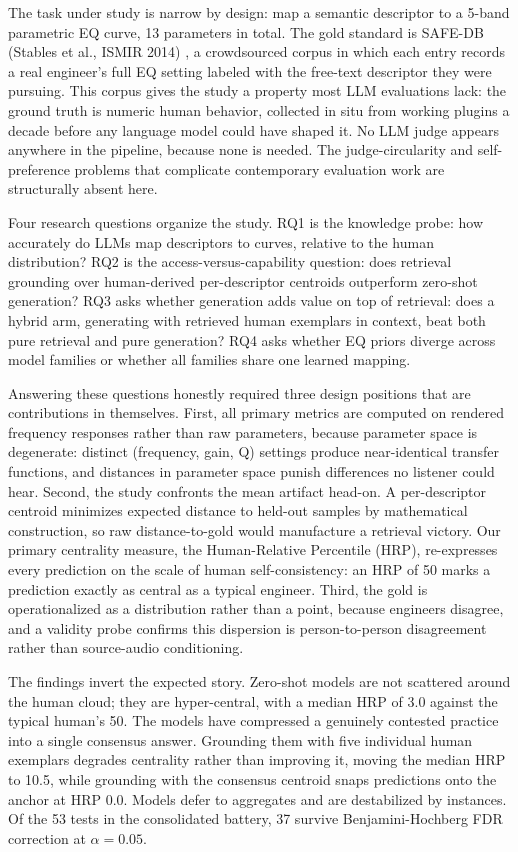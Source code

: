 \documentclass[11pt]{article}
\begin{document}
The task under study is narrow by design: map a semantic descriptor to a 5-band parametric EQ curve, 13 parameters in total. The gold standard is SAFE-DB (Stables et al., ISMIR 2014) \cite{stables2014safe}, a crowdsourced corpus in which each entry records a real engineer's full EQ setting labeled with the free-text descriptor they were pursuing. This corpus gives the study a property most LLM evaluations lack: the ground truth is numeric human behavior, collected in situ from working plugins a decade before any language model could have shaped it. No LLM judge appears anywhere in the pipeline, because none is needed. The judge-circularity and self-preference problems that complicate contemporary evaluation work are structurally absent here.

Four research questions organize the study. RQ1 is the knowledge probe: how accurately do LLMs map descriptors to curves, relative to the human distribution? RQ2 is the access-versus-capability question: does retrieval grounding over human-derived per-descriptor centroids outperform zero-shot generation? RQ3 asks whether generation adds value on top of retrieval: does a hybrid arm, generating with retrieved human exemplars in context, beat both pure retrieval and pure generation? RQ4 asks whether EQ priors diverge across model families or whether all families share one learned mapping.

Answering these questions honestly required three design positions that are contributions in themselves. First, all primary metrics are computed on rendered frequency responses rather than raw parameters, because parameter space is degenerate: distinct (frequency, gain, Q) settings produce near-identical transfer functions, and distances in parameter space punish differences no listener could hear. Second, the study confronts the mean artifact head-on. A per-descriptor centroid minimizes expected distance to held-out samples by mathematical construction, so raw distance-to-gold would manufacture a retrieval victory. Our primary centrality measure, the Human-Relative Percentile (HRP), re-expresses every prediction on the scale of human self-consistency: an HRP of 50 marks a prediction exactly as central as a typical engineer. Third, the gold is operationalized as a distribution rather than a point, because engineers disagree, and a validity probe confirms this dispersion is person-to-person disagreement rather than source-audio conditioning.

The findings invert the expected story. Zero-shot models are not scattered around the human cloud; they are hyper-central, with a median HRP of 3.0 against the typical human's 50. The models have compressed a genuinely contested practice into a single consensus answer. Grounding them with five individual human exemplars degrades centrality rather than improving it, moving the median HRP to 10.5, while grounding with the consensus centroid snaps predictions onto the anchor at HRP 0.0. Models defer to aggregates and are destabilized by instances. Of the 53 tests in the consolidated battery, 37 survive Benjamini-Hochberg FDR correction at $\alpha = 0.05$.
\end{document}
